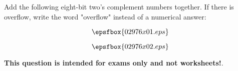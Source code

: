 

Add the following eight-bit two's complement numbers together.  If there is overflow, write the word "overflow" instead of a numerical answer:

\vskip 10pt

$$\epsfbox{02976x01.eps}$$

\vskip 10pt







$$\epsfbox{02976x02.eps}$$







{\bf This question is intended for exams only and not worksheets!}.





